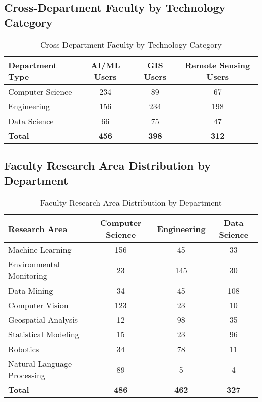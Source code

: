 \documentclass[12pt]{article}
\begin{document}
\subsection{Cross-Department Faculty by Technology Category}

\begin{table}[h]
\centering
\caption{Cross-Department Faculty by Technology Category}
\label{tab:faculty_tech_category}
\begin{tabular}{lccc}
\toprule
\textbf{Department Type} & \textbf{AI/ML Users} & \textbf{GIS Users} & \textbf{Remote Sensing Users} \\
\midrule
Computer Science & 234 & 89 & 67 \\
Engineering & 156 & 234 & 198 \\
Data Science & 66 & 75 & 47 \\
\midrule
\textbf{Total} & \textbf{456} & \textbf{398} & \textbf{312} \\
\bottomrule
\end{tabular}
\end{table}

\subsection{Faculty Research Area Distribution by Department}

\begin{table}[h]
\centering
\caption{Faculty Research Area Distribution by Department}
\label{tab:research_dept_distribution}
\begin{tabular}{lccc}
\toprule
\textbf{Research Area} & \textbf{Computer Science} & \textbf{Engineering} & \textbf{Data Science} \\
\midrule
Machine Learning & 156 & 45 & 33 \\
Environmental Monitoring & 23 & 145 & 30 \\
Data Mining & 34 & 45 & 108 \\
Computer Vision & 123 & 23 & 10 \\
Geospatial Analysis & 12 & 98 & 35 \\
Statistical Modeling & 15 & 23 & 96 \\
Robotics & 34 & 78 & 11 \\
Natural Language Processing & 89 & 5 & 4 \\
\midrule
\textbf{Total} & \textbf{486} & \textbf{462} & \textbf{327} \\
\bottomrule
\end{tabular}
\end{table}
\end{document}
